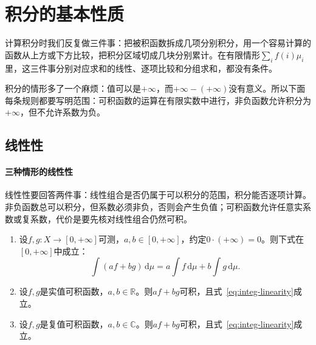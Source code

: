 \section{积分的基本性质}
\label{sec:integ-basic-properties}

计算积分时我们反复做三件事：把被积函数拆成几项分别积分，用一个容易计算的函数从上方或下方比较，把积分区域切成几块分别累计。在有限情形$\sum_if(i)\mu_i$里，这三件事分别对应求和的线性、逐项比较和分组求和，都没有条件。

积分的情形多了一个麻烦：值可以是$+\infty$，而$+\infty-(+\infty)$没有意义。所以下面每条规则都要写明范围：可积函数的运算在有限实数中进行，非负函数允许积分为$+\infty$，但不允许系数为负。

\subsection{线性性}
\label{sec:integ-linearity}

\paragraph{三种情形的线性性}
线性性要回答两件事：线性组合是否仍属于可以积分的范围，积分能否逐项计算。非负函数总可以积分，但系数必须非负，否则会产生负值；可积函数允许任意实系数或复系数，代价是要先核对线性组合仍然可积。

\begin{theorem}[积分的线性性]
\label{thm:integ-linearity}
\begin{enumerate}
 \item 设$f,g:X\to[0,+\infty]$可测，$a,b\in[0,+\infty]$，约定$0\cdot(+\infty)=0$。则下式在$[0,+\infty]$中成立：
 \begin{equation}
  \int(af+bg)\,\mathrm d\mu=a\int f\,\mathrm d\mu+b\int g\,\mathrm d\mu .
  \label{eq:integ-linearity}
 \end{equation}
 \item 设$f,g$是实值可积函数，$a,b\in\mathbb R$。则$af+bg$可积，且式~\eqref{eq:integ-linearity}成立。
 \item 设$f,g$是复值可积函数，$a,b\in\mathbb C$。则$af+bg$可积，且式~\eqref{eq:integ-linearity}成立。
\end{enumerate}
\end{theorem}

